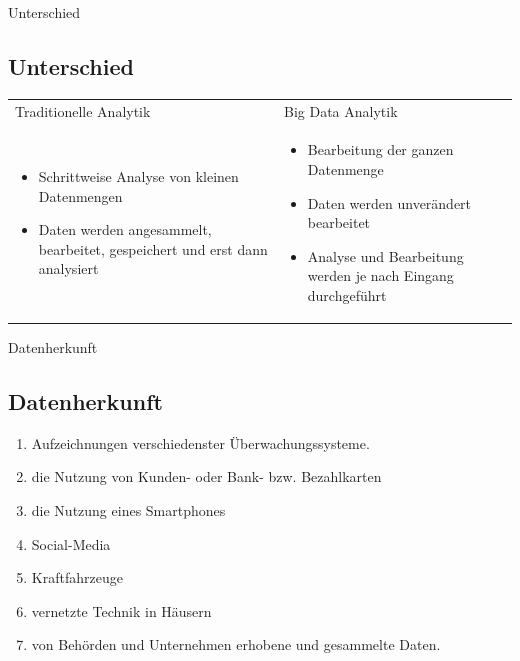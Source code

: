 \documentclass[11pt]{beamer}
\begin{document}
\begin{frame}{Unterschied}
\subsection{Unterschied}
\setlength\tabcolsep{0pt}
\setlength\thickmuskip{0mu}
\setlength\medmuskip{0mu}
\small
\centering
\begin{tabular*}{\textwidth}{ p{145pt} p{145pt}} 
Traditionelle Analytik & Big Data Analytik \\ 
\begin{itemize}
\item Schrittweise Analyse von kleinen Datenmengen
\item Daten werden angesammelt, bearbeitet, gespeichert und erst dann analysiert 
\end{itemize}
&
\begin{itemize}
\item Bearbeitung der ganzen Datenmenge 
\item Daten werden unverändert bearbeitet
\item Analyse und Bearbeitung werden je nach Eingang durchgeführt 
\end{itemize}

\end{tabular*} 
\end{frame}

\begin{frame}{Datenherkunft}
\subsection{Datenherkunft}
\begin{enumerate}
\item Aufzeichnungen verschiedenster Überwachungssysteme.
\item die Nutzung von Kunden- oder Bank- bzw. Bezahlkarten 
\item die Nutzung eines Smartphones
\item Social-Media
\item Kraftfahrzeuge
\item vernetzte Technik in Häusern
\item von Behörden und Unternehmen erhobene und gesammelte Daten.
\end{enumerate}
\end{frame}
\end{document}
